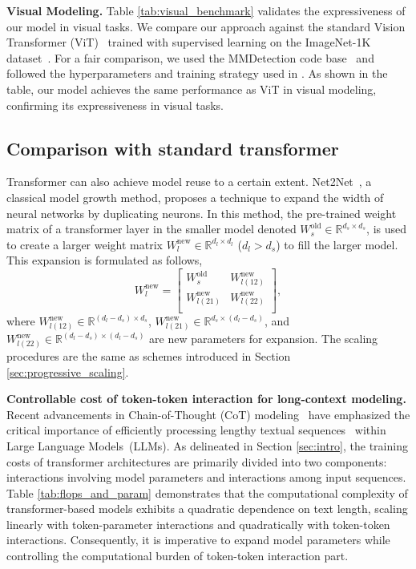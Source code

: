 \documentclass{article} %
\begin{document}
\textbf{Visual Modeling.} Table \ref{tab:visual_benchmark} validates the expressiveness of our model in visual tasks. We compare our approach against the standard Vision Transformer (ViT)~\citep{dosovitskiy2021an} trained with supervised learning on the ImageNet-1K dataset~\citep{deng2009imagenet}. For a fair comparison, we used the MMDetection code base~\citep{MMDetection} and followed the hyperparameters and training strategy used in \citet{he2022masked}. As shown in the table, our model achieves the same performance as ViT in visual modeling, confirming its expressiveness in visual tasks.
\subsection{Comparison with standard transformer} \label{sec:compare_with_transformer}
Transformer can also achieve model reuse to a certain extent. Net2Net~\citep{chen2015net2net}, a classical model growth method, proposes a technique to expand the width of neural networks by duplicating neurons. In this method, the pre-trained weight matrix of a transformer layer in the smaller model denoted $W_s^{\text{old}} \in \mathbb{R}^{d_s \times d_s}$, is used to create a larger weight matrix $W_l^{\text{new}} \in \mathbb{R}^{d_l \times d_l}$ ($d_l > d_s$) to fill the larger model. This expansion is formulated as follows,
\begin{equation}
    W_l^{\text{new}} = \left[                
  \begin{array}{cc}   
    W_s^{\text{old}} & W_{l(12)}^{\text{new}} \\  
    W_{l(21)}^{\text{new}} & W_{l(22)}^{\text{new}} \\ 
  \end{array}
\right],
\end{equation}
where $W_{l(12)}^{\text{new}} \in \mathbb{R}^{(d_l-d_s) \times d_s}$, $W_{l(21)}^{\text{new}} \in \mathbb{R}^{d_s \times (d_l-d_s)}$, and $W_{l(22)}^{\text{new}} \in \mathbb{R}^{(d_l-d_s) \times (d_l-d_s)}$ are new parameters for expansion. The scaling procedures are the same as schemes introduced in Section \ref{sec:progressive_scaling}. 

\textbf{Controllable cost of token-token interaction for long-context modeling.} Recent advancements in Chain-of-Thought (CoT) modeling~\citep{wei2022chain} have emphasized the critical importance of efficiently processing lengthy textual sequences~\citep{effcienttransformer} within Large Language Models~(LLMs).  As delineated in Section \ref{sec:intro}, the training costs of transformer architectures are primarily divided into two components: interactions involving model parameters and interactions among input sequences. Table \ref{tab:flops_and_param} demonstrates that the computational complexity of transformer-based models exhibits a quadratic dependence on text length, scaling linearly with token-parameter interactions and quadratically with token-token interactions. Consequently, it is imperative to expand model parameters while controlling the computational burden of token-token interaction part.
\end{document}
